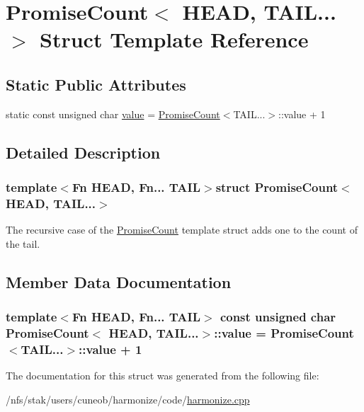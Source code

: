 \hypertarget{structPromiseCount_3_01HEAD_00_01TAIL_8_8_8_4}{\section{Promise\-Count$<$ H\-E\-A\-D, T\-A\-I\-L...$>$ Struct Template Reference}
\label{structPromiseCount_3_01HEAD_00_01TAIL_8_8_8_4}
}
\subsection*{Static Public Attributes}
\begin{DoxyCompactItemize}
\item 
static const unsigned char \hyperlink{structPromiseCount_3_01HEAD_00_01TAIL_8_8_8_4_aa8acd7c163898812cfe4dc5f3837a457}{value} = \hyperlink{structPromiseCount}{Promise\-Count}$<$T\-A\-I\-L...$>$\-::value + 1
\end{DoxyCompactItemize}


\subsection{Detailed Description}
\subsubsection*{template$<$Fn H\-E\-A\-D, Fn... T\-A\-I\-L$>$struct Promise\-Count$<$ H\-E\-A\-D, T\-A\-I\-L...$>$}

The recursive case of the {\ttfamily \hyperlink{structPromiseCount}{Promise\-Count}} template struct adds one to the count of the tail. 

\subsection{Member Data Documentation}
\hypertarget{structPromiseCount_3_01HEAD_00_01TAIL_8_8_8_4_aa8acd7c163898812cfe4dc5f3837a457}{
\subsubsection[{value}]{\setlength{\rightskip}{0pt plus 5cm}template$<$Fn H\-E\-A\-D, Fn... T\-A\-I\-L$>$ const unsigned char {\bf Promise\-Count}$<$ H\-E\-A\-D, T\-A\-I\-L...$>$\-::value = {\bf Promise\-Count}$<$T\-A\-I\-L...$>$\-::value + 1\hspace{0.3cm}{\ttfamily [static]}}}\label{structPromiseCount_3_01HEAD_00_01TAIL_8_8_8_4_aa8acd7c163898812cfe4dc5f3837a457}


The documentation for this struct was generated from the following file\-:\begin{DoxyCompactItemize}
\item 
/nfs/stak/users/cuneob/harmonize/code/\hyperlink{harmonize_8cpp}{harmonize.\-cpp}\end{DoxyCompactItemize}
